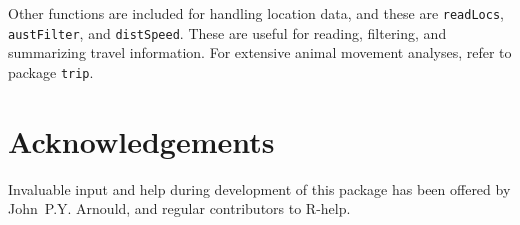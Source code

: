 \documentclass[12pt, letterpaper]{scrartcl}
\newcommand{\Rfunction}[1]{{\texttt{#1}}}
\newcommand{\Rpackage}[1]{{\texttt{#1}}}
\begin{document}
Other functions are included for handling location data, and these are
\Rfunction{readLocs}, \Rfunction{austFilter}, and \Rfunction{distSpeed}.
These are useful for reading, filtering, and summarizing travel
information.  For extensive animal movement analyses, refer to package
\Rpackage{trip}.


\section{Acknowledgements}
\label{sec:acknowledgements}

Invaluable input and help during development of this package has been
offered by John~P.Y. Arnould, and regular contributors to R-help.






\newpage{}

\end{document}
